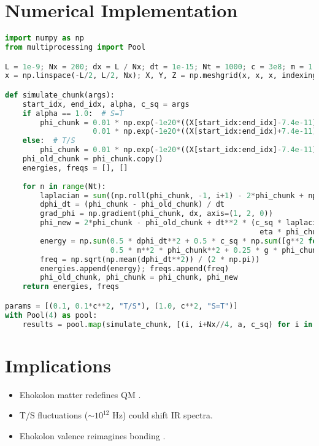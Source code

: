 \documentclass{article}
\begin{document}
\section{Numerical Implementation}
\begin{lstlisting}[language=Python, caption=Ehokolon Matter Simulation, label=lst:matter]
import numpy as np
from multiprocessing import Pool

L = 1e-9; Nx = 200; dx = L / Nx; dt = 1e-15; Nt = 1000; c = 3e8; m = 1.0; g = 0.1; eta = 0.01; k = 0.01
x = np.linspace(-L/2, L/2, Nx); X, Y, Z = np.meshgrid(x, x, x, indexing='ij')

def simulate_chunk(args):
    start_idx, end_idx, alpha, c_sq = args
    if alpha == 1.0:  # S=T
        phi_chunk = 0.01 * np.exp(-1e20*((X[start_idx:end_idx]-7.4e-11)**2 + Y[start_idx:end_idx]**2 + Z[start_idx:end_idx]**2)) + \
                    0.01 * np.exp(-1e20*((X[start_idx:end_idx]+7.4e-11)**2 + Y[start_idx:end_idx]**2 + Z[start_idx:end_idx]**2))
    else:  # T/S
        phi_chunk = 0.01 * np.exp(-1e20*((X[start_idx:end_idx]-7.4e-11)**2 + Y[start_idx:end_idx]**2 + Z[start_idx:end_idx]**2)) * np.cos(1e12 * X[start_idx:end_idx])
    phi_old_chunk = phi_chunk.copy()
    energies, freqs = [], []
    
    for n in range(Nt):
        laplacian = sum((np.roll(phi_chunk, -1, i+1) - 2*phi_chunk + np.roll(phi_chunk, 1, i+1)) / dx**2 for i in range(2))
        dphi_dt = (phi_chunk - phi_old_chunk) / dt
        grad_phi = np.gradient(phi_chunk, dx, axis=(1, 2, 0))
        phi_new = 2*phi_chunk - phi_old_chunk + dt**2 * (c_sq * laplacian - m**2 * phi_chunk - g * phi_chunk**3 - 
                                                          eta * phi_chunk**5 + 8 * np.pi * 6.674e-11 * k * phi_chunk**2)
        energy = np.sum(0.5 * dphi_dt**2 + 0.5 * c_sq * np.sum([g**2 for g in grad_phi], 0) + 
                        0.5 * m**2 * phi_chunk**2 + 0.25 * g * phi_chunk**4 + 0.1667 * eta * phi_chunk**6) * dx**3 * 1.602e-19
        freq = np.sqrt(np.mean(dphi_dt**2)) / (2 * np.pi))
        energies.append(energy); freqs.append(freq)
        phi_old_chunk, phi_chunk = phi_chunk, phi_new
    return energies, freqs

params = [(0.1, 0.1*c**2, "T/S"), (1.0, c**2, "S=T")]
with Pool(4) as pool:
    results = pool.map(simulate_chunk, [(i, i+Nx//4, a, c_sq) for i in range(0, Nx, Nx//4) for a, c_sq, _ in params])
\end{lstlisting}

\section{Implications}
\begin{itemize}
    \item Ehokolon matter redefines QM \cite{emvula2025mass}.
    \item T/S fluctuations ($\sim 10^{12}$ Hz) could shift IR spectra.
    \item Ehokolon valence reimagines bonding \cite{emvula2025foundation}.
\end{itemize}
\end{document}
